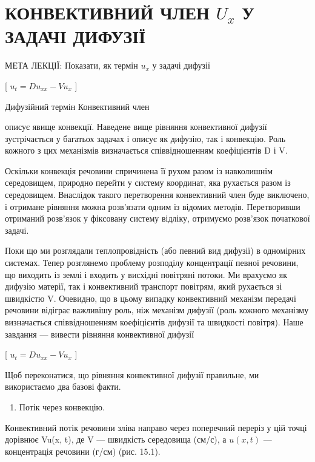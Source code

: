 \documentclass[
]{article}
\providecommand{\tightlist}{%
  \setlength{\itemsep}{0pt}\setlength{\parskip}{0pt}}
\begin{document}
{{\section{\texorpdfstring{КОНВЕКТИВНИЙ ЧЛЕН \(U_x\) У ЗАДАЧІ
ДИФУЗІЇ}{КОНВЕКТИВНИЙ ЧЛЕН U\_x У ЗАДАЧІ ДИФУЗІЇ}}\label{ux43aux43eux43dux432ux435ux43aux442ux438ux432ux43dux438ux439-ux447ux43bux435ux43d-u_x-ux443-ux437ux430ux434ux430ux447ux456-ux434ux438ux444ux443ux437ux456ux457}

МЕТА ЛЕКЦІЇ: Показати, як термін \(u_x\) у задачі дифузії

{[} \(u_t = Du_{xx} - Vu_x\) {]}

Дифузійний термін Конвективний член

описує явище конвекції. Наведене вище рівняння конвективної дифузії
зустрічається у багатьох задачах і описує як дифузію, так і конвекцію.
Роль кожного з цих механізмів визначається співвідношенням коефіцієнтів
D і V.

Оскільки конвекція речовини спричинена її рухом разом із навколишнім
середовищем, природно перейти у систему координат, яка рухається разом
із середовищем. Внаслідок такого перетворення конвективний член буде
виключено, і отримане рівняння можна розв'язати одним із відомих
методів. Перетворивши отриманий розв'язок у фіксовану систему відліку,
отримуємо розв'язок початкової задачі.

Поки що ми розглядали теплопровідність (або певний вид дифузії) в
одномірних системах. Тепер розглянемо проблему розподілу концентрації
певної речовини, що виходить із землі і входить у висхідні повітряні
потоки. Ми врахуємо як дифузію матерії, так і конвективний транспорт
повітрям, який рухається зі швидкістю V. Очевидно, що в цьому випадку
конвективний механізм передачі речовини відіграє важливішу роль, ніж
механізм дифузії (роль кожного механізму визначається співвідношенням
коефіцієнтів дифузії та швидкості повітря). Наше завдання --- вивести
рівняння конвективної дифузії

{[} \(u_t = Du_{xx} - Vu_x\) {]}

Щоб переконатися, що рівняння конвективної дифузії правильне, ми
використаємо два базові факти.

\begin{enumerate}
\def\labelenumi{\arabic{enumi}.}
\tightlist
\item
  Потік через конвекцію.
\end{enumerate}

Конвективний потік речовини зліва направо через поперечний переріз у цій
точці дорівнює Vu(x, t), де V --- швидкість середовища (см/с), а
\(u(x, t)\) --- концентрація речовини (г/см) (рис. 15.1).

}}
\end{document}
